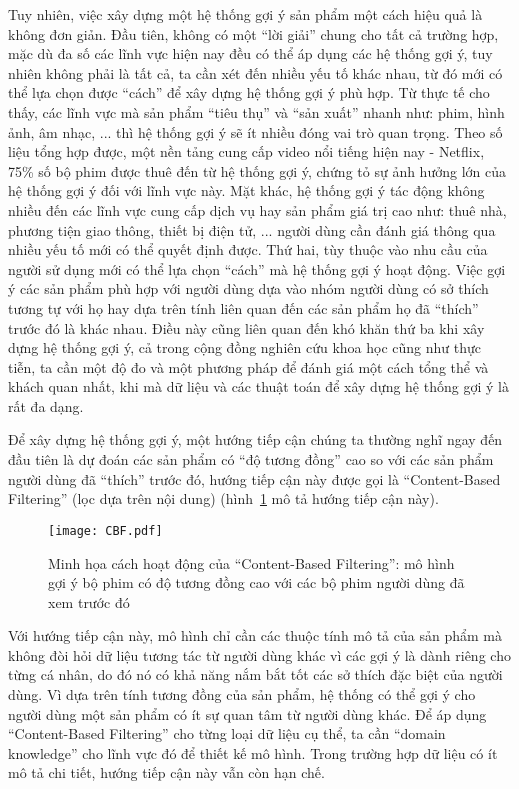 Tuy nhiên, việc xây dựng một hệ thống gợi ý sản phẩm một cách hiệu quả là không đơn giản.
Đầu tiên, không có một ``lời giải'' chung cho tất cả trường hợp,
mặc dù đa số các lĩnh vực hiện nay đều có thể áp dụng các hệ thống gợi ý, tuy nhiên không phải là tất cả,
ta cần xét đến nhiều yếu tố khác nhau, 
từ đó mới có thể lựa chọn được ``cách'' để xây dựng hệ thống gợi ý phù hợp. %
Từ thực tế cho thấy, các lĩnh vực mà sản phẩm ``tiêu thụ'' và ``sản xuất'' nhanh như: phim, hình ảnh, âm nhạc, ... 
thì hệ thống gợi ý sẽ ít nhiều đóng vai trò quan trọng. 
Theo số liệu tổng hợp được, một nền tảng cung cấp video nổi tiếng hiện nay - Netflix,
75\% số bộ phim được thuê đến từ hệ thống gợi ý, chứng tỏ sự ảnh hưởng lớn của hệ thống gợi ý đối với lĩnh vực này. 
Mặt khác, hệ thống gợi ý tác động không nhiều đến các lĩnh vực cung cấp dịch vụ hay sản phẩm giá trị cao như:
thuê nhà, phương tiện giao thông, thiết bị điện tử, ... người dùng cần đánh giá thông qua nhiều yếu tố mới có thể quyết định được. 
Thứ hai, tùy thuộc vào nhu cầu của người sử dụng mới có thể lựa chọn ``cách'' mà hệ thống gợi ý hoạt động.
Việc gợi ý các sản phẩm phù hợp với người dùng dựa vào nhóm người dùng có sở thích tương tự với họ 
hay dựa trên tính liên quan đến các sản phẩm họ đã ``thích'' trước đó là khác nhau. 
Điều này cũng liên quan đến khó khăn thứ ba khi xây dựng hệ thống gợi ý, cả trong cộng đồng nghiên cứu khoa học cũng như thực tiễn, 
ta cần một độ đo và một phương pháp để đánh giá một cách tổng thể và khách quan nhất, 
khi mà dữ liệu và các thuật toán để xây dựng hệ thống gợi ý là rất đa dạng.

Để xây dựng hệ thống gợi ý, một hướng tiếp cận chúng ta thường nghĩ ngay đến đầu tiên
là dự đoán các sản phẩm có ``độ tương đồng'' cao so với các sản phẩm người dùng đã ``thích'' trước đó,
hướng tiếp cận này được gọi là ``Content-Based Filtering'' (lọc dựa trên nội dung) (hình~\ref{fig_CBF} mô tả hướng tiếp cận này).
\begin{figure}
    \centering
	\texttt{[image: CBF.pdf]}
    \caption{Minh họa cách hoạt động của ``Content-Based Filtering'':
    mô hình gợi ý bộ phim có độ tương đồng cao với các bộ phim
    người dùng đã xem trước đó}
    \label{fig_CBF}
\end{figure}
Với hướng tiếp cận này, mô hình chỉ cần các thuộc tính mô tả của sản phẩm mà 
không đòi hỏi dữ liệu tương tác từ người dùng khác
vì các gợi ý là dành riêng cho từng cá nhân, do đó nó có khả năng nắm bắt tốt các sở thích
đặc biệt của người dùng.
Vì dựa trên tính tương đồng của sản phẩm, hệ thống có thể gợi ý cho người dùng một sản phẩm có ít sự quan tâm từ người dùng khác.
Để áp dụng ``Content-Based Filtering'' cho từng loại dữ liệu cụ thể,
ta cần ``domain knowledge'' cho lĩnh vực đó để thiết kế mô hình.
Trong trường hợp dữ liệu có ít mô tả chi tiết, hướng tiếp cận này vẫn còn hạn chế.

